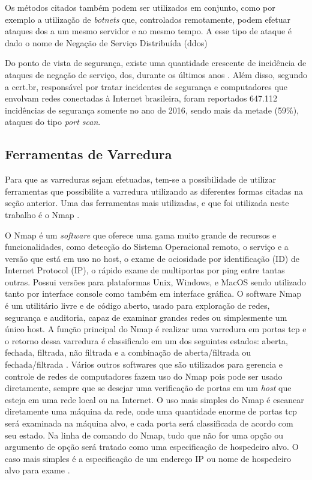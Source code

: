 Os métodos citados também podem ser utilizados em conjunto, como por exemplo a utilização de \textit{botnets} que, controlados remotamente, podem efetuar ataques \gls{dos} a um mesmo servidor e ao mesmo tempo. A esse tipo de ataque é dado o nome de Negação de Serviço Distribuída (\gls{ddos})

Do ponto de vista de segurança, existe uma quantidade crescente de incidência de ataques de negação de serviço, \gls{dos}, durante os últimos anos \cite{Seeber:2015}. Além disso, segundo a \gls{cert.br}, responsável por tratar incidentes de segurança e computadores que envolvam redes conectadas à Internet brasileira, foram reportados 647.112 incidências de segurança somente no ano de 2016, sendo mais da metade (59\%), ataques do tipo \textit{port scan}.



\subsection{Ferramentas de Varredura}

Para que as varreduras sejam efetuadas, tem-se a possibilidade de utilizar ferramentas que possibilite a varredura utilizando as diferentes formas citadas na seção anterior. Uma das ferramentas mais utilizadas, e que foi utilizada neste trabalho é o Nmap \cite{Lyon:2009}.

O Nmap é um \textit{software} que oferece uma gama muito grande de recursos e funcionalidades, como detecção do Sistema Operacional remoto, o serviço e a versão que está em uso no host, o exame de ociosidade por identificação (ID) de Internet Protocol (IP), o rápido exame de multiportas por ping entre tantas outras. Possui versões para plataformas Unix, Windows, e MacOS sendo utilizado tanto por interface console como também em interface gráfica. O software Nmap é um utilitário livre e de código aberto, usado para exploração de redes, segurança e auditoria, capaz de examinar grandes redes ou simplesmente um único host.
A função principal do Nmap é realizar uma varredura em portas \gls{tcp} e o retorno dessa varredura é classificado em um dos seguintes estados: aberta, fechada, filtrada, não filtrada e a combinação de aberta/filtrada ou fechada/filtrada \cite{Lyon:2009}. Vários outros softwares que são utilizados para gerencia e controle de redes de computadores fazem uso do Nmap pois pode ser usado diretamente, sempre que se desejar uma verificação de portas em um \textit{host} que esteja em uma rede local ou na Internet.
O uso mais simples do Nmap é escanear diretamente uma máquina da rede, onde uma quantidade enorme de portas \gls{tcp} será examinada na máquina alvo, e cada porta será classificada de acordo com seu estado.
Na linha de comando do Nmap, tudo que não for uma opção ou argumento de opção será tratado como uma especificação de hospedeiro alvo. O caso mais simples é a especificação de um endereço IP ou nome de hospedeiro alvo para exame \cite{Lyon:2009}.


